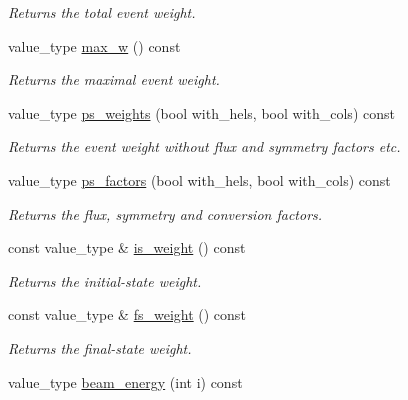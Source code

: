 \begin{DoxyCompactItemize}
\begin{DoxyCompactList}\small\item\em Returns the total event weight. \end{DoxyCompactList}\item 
\hypertarget{a00441_a1d5f904414f9b7a2d505b0e1a434650c}{value\-\_\-type \hyperlink{a00441_a1d5f904414f9b7a2d505b0e1a434650c}{max\-\_\-w} () const }\label{a00441_a1d5f904414f9b7a2d505b0e1a434650c}

\begin{DoxyCompactList}\small\item\em Returns the maximal event weight. \end{DoxyCompactList}\item 
value\-\_\-type \hyperlink{a00441_a6021d938f5d5a1d6e9d75c50a103da6c}{ps\-\_\-weights} (bool with\-\_\-hels, bool with\-\_\-cols) const 
\begin{DoxyCompactList}\small\item\em Returns the event weight without flux and symmetry factors etc. \end{DoxyCompactList}\item 
value\-\_\-type \hyperlink{a00441_a3df10808826029ddf5b92e9bc1d83004}{ps\-\_\-factors} (bool with\-\_\-hels, bool with\-\_\-cols) const 
\begin{DoxyCompactList}\small\item\em Returns the flux, symmetry and conversion factors. \end{DoxyCompactList}\item 
\hypertarget{a00441_a03d3bfe27e39d60c830d3673b067c904}{const value\-\_\-type \& \hyperlink{a00441_a03d3bfe27e39d60c830d3673b067c904}{is\-\_\-weight} () const }\label{a00441_a03d3bfe27e39d60c830d3673b067c904}

\begin{DoxyCompactList}\small\item\em Returns the initial-\/state weight. \end{DoxyCompactList}\item 
\hypertarget{a00441_a3deb84c93dfe91660dad8500204cd61d}{const value\-\_\-type \& \hyperlink{a00441_a3deb84c93dfe91660dad8500204cd61d}{fs\-\_\-weight} () const }\label{a00441_a3deb84c93dfe91660dad8500204cd61d}

\begin{DoxyCompactList}\small\item\em Returns the final-\/state weight. \end{DoxyCompactList}\item 
\hypertarget{a00441_a31b352c61bdd00a65bfbc541bd14d142}{value\-\_\-type \hyperlink{a00441_a31b352c61bdd00a65bfbc541bd14d142}{beam\-\_\-energy} (int i) const }\label{a00441_a31b352c61bdd00a65bfbc541bd14d142}


\end{DoxyCompactItemize}
